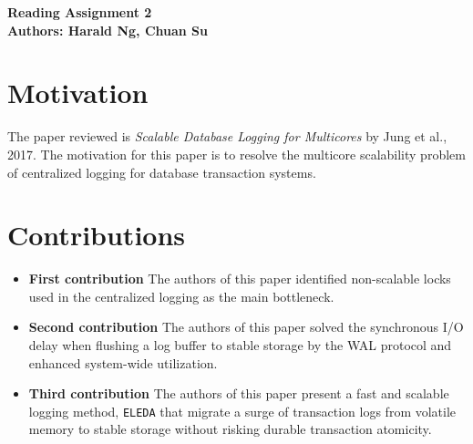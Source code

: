 \documentclass[10pt]{proc}
\begin{document}
  \large{\textbf{Reading Assignment 2}}\\

  \large{\textbf{Authors: Harald Ng, Chuan Su}}\\

  \section{Motivation}
  The paper reviewed is \textit{Scalable Database Logging for Multicores} by Jung et al., 2017.
  The motivation for this paper is to resolve the multicore scalability problem of centralized logging for database transaction systems.

  \section{Contributions}
  \begin{itemize}
    \item \textbf{First contribution}
    The authors of this paper identified non-scalable locks used in the centralized logging as the main bottleneck.
    \item \textbf{Second contribution}
    The authors of this paper solved the synchronous I/O delay when flushing a log buffer to stable storage by the WAL protocol and enhanced system-wide utilization.
    \item \textbf{Third contribution}
    The authors of this paper present a fast and scalable logging method, \texttt{ELEDA} that migrate a surge of transaction logs from volatile memory to stable storage without risking durable transaction atomicity.
  \end{itemize}
\end{document}

